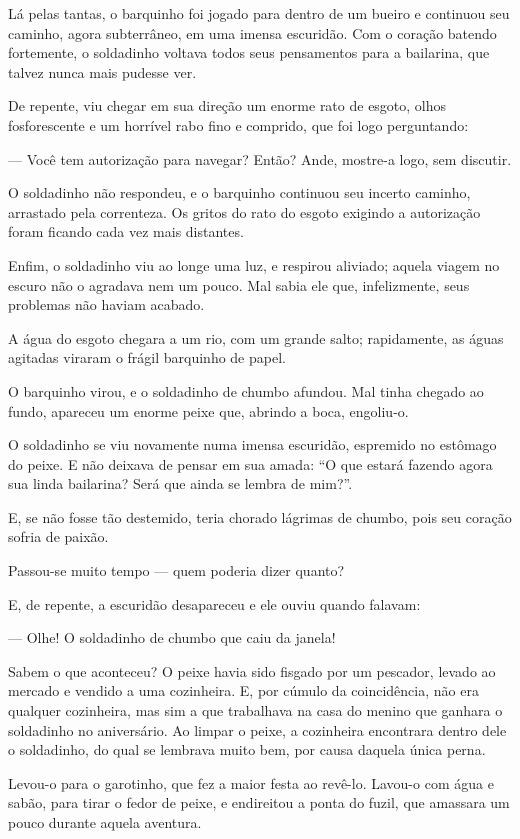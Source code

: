 \begin{conteudo}
\begin{conteudo}
\begin{conteudo}
\begin{conteudo}
\begin{conteudo}
\begin{myquote}
Lá pelas tantas, o barquinho foi jogado para dentro de um bueiro e
continuou seu caminho, agora subterrâneo, em uma imensa escuridão. Com o
coração batendo fortemente, o soldadinho voltava todos seus pensamentos
para a bailarina, que talvez nunca mais pudesse ver.

De repente, viu chegar em sua direção um enorme rato de esgoto, olhos
fosforescente e um horrível rabo fino e comprido, que foi logo
perguntando:

--- Você tem autorização para navegar? Então? Ande, mostre-a logo, sem
discutir.

O soldadinho não respondeu, e o barquinho continuou seu incerto caminho,
arrastado pela correnteza. Os gritos do rato do esgoto exigindo a
autorização foram ficando cada vez mais distantes.

Enfim, o soldadinho viu ao longe uma luz, e respirou aliviado; aquela
viagem no escuro não o agradava nem um pouco. Mal sabia ele que,
infelizmente, seus problemas não haviam acabado.

A água do esgoto chegara a um rio, com um grande salto; rapidamente, as
águas agitadas viraram o frágil barquinho de papel.

O barquinho virou, e o soldadinho de chumbo afundou. Mal tinha chegado
ao fundo, apareceu um enorme peixe que, abrindo a boca, engoliu-o.

O soldadinho se viu novamente numa imensa escuridão, espremido no
estômago do peixe. E não deixava de pensar em sua amada: ``O que estará
fazendo agora sua linda bailarina? Será que ainda se lembra de mim?''.

E, se não fosse tão destemido, teria chorado lágrimas de chumbo, pois
seu coração sofria de paixão.

Passou-se muito tempo --- quem poderia dizer quanto?

E, de repente, a escuridão desapareceu e ele ouviu quando falavam:

--- Olhe! O soldadinho de chumbo que caiu da janela!

Sabem o que aconteceu? O peixe havia sido fisgado por um pescador,
levado ao mercado e vendido a uma cozinheira. E, por cúmulo da
coincidência, não era qualquer cozinheira, mas sim a que trabalhava na
casa do menino que ganhara o soldadinho no aniversário. Ao limpar o
peixe, a cozinheira encontrara dentro dele o soldadinho, do qual se
lembrava muito bem, por causa daquela única perna.

Levou-o para o garotinho, que fez a maior festa ao revê-lo. Lavou-o com
água e sabão, para tirar o fedor de peixe, e endireitou a ponta do
fuzil, que amassara um pouco durante aquela aventura.


\end{myquote}
\end{conteudo}
\end{conteudo}
\end{conteudo}
\end{conteudo}
\end{conteudo}
